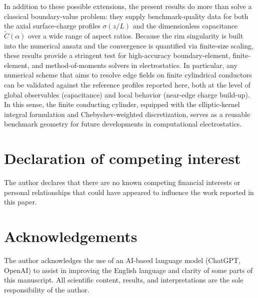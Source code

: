 \documentclass[12pt]{article}
\begin{document}
In addition to these possible extensions, the present results do more than
solve a classical boundary-value problem: they supply benchmark-quality data
for both the axial surface-charge profiles $\sigma(z/L)$ and the dimensionless
capacitance $\widetilde{C}(\alpha)$ over a wide range of aspect ratios.
Because the rim singularity is built into the numerical ansatz and the
convergence is quantified via finite-size scaling, these results provide a
stringent test for high-accuracy boundary-element, finite-element, and
method-of-moments solvers in electrostatics. In particular, any numerical
scheme that aims to resolve edge fields on finite cylindrical conductors can
be validated against the reference profiles reported here, both at the level
of global observables (capacitance) and local behavior (near-edge charge
build-up). In this sense, the finite conducting cylinder, equipped with the
elliptic-kernel integral formulation and Chebyshev-weighted discretization,
serves as a reusable benchmark geometry for future developments in
computational electrostatics.

\section*{Declaration of competing interest}

The author declares that there are no known competing financial interests or
personal relationships that could have appeared to influence the work reported
in this paper.

\section*{Acknowledgements}

The author acknowledges the use of an AI-based language model (ChatGPT,
OpenAI) to assist in improving the English language and clarity of some parts
of this manuscript. All scientific content, results, and interpretations are
the sole responsibility of the author.
\end{document}
